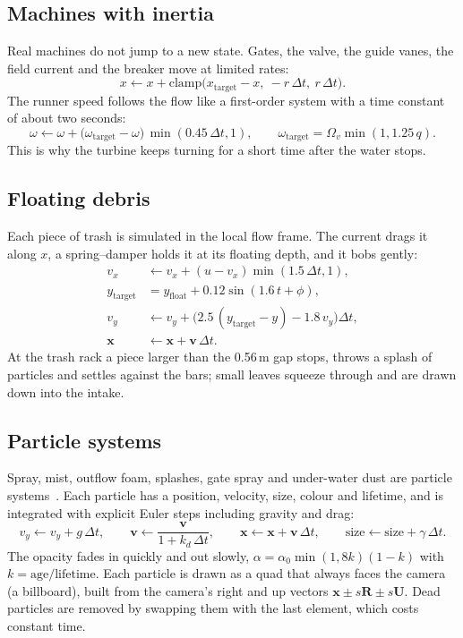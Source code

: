 \documentclass[11pt,a4paper]{report}
\newcommand{\vect}[1]{\mathbf{#1}}
\begin{document}
\subsection{Machines with inertia}

Real machines do not jump to a new state. Gates, the valve, the guide vanes, the field
current and the breaker move at limited rates:
\begin{equation}
x \leftarrow x + \text{clamp}\big(x_{\text{target}} - x,\ -r\,\Delta t,\ r\,\Delta t\big).
\end{equation}
The runner speed follows the flow like a first-order system with a time constant of
about two seconds:
\begin{equation}
\omega \leftarrow \omega + \big(\omega_{\text{target}} - \omega\big)\,\min(0.45\,\Delta t, 1),
\qquad \omega_{\text{target}} = \Omega_v \min(1, 1.25\,q).
\end{equation}
This is why the turbine keeps turning for a short time after the water stops.

\subsection{Floating debris}

Each piece of trash is simulated in the local flow frame. The current drags it along
$x$, a spring--damper holds it at its floating depth, and it bobs gently:
\begin{align}
v_x &\leftarrow v_x + (u - v_x)\min(1.5\,\Delta t, 1), \\
y_{\text{target}} &= y_{\text{float}} + 0.12\sin(1.6\,t + \phi), \\
v_y &\leftarrow v_y + \big(2.5\,(y_{\text{target}} - y) - 1.8\,v_y\big)\Delta t, \\
\vect{x} &\leftarrow \vect{x} + \vect{v}\,\Delta t .
\end{align}
At the trash rack a piece larger than the 0.56\,m gap stops, throws a splash of
particles and settles against the bars; small leaves squeeze through and are drawn
down into the intake.

\subsection{Particle systems}

Spray, mist, outflow foam, splashes, gate spray and under-water dust are particle
systems~\cite{reeves83}. Each particle has a position, velocity, size, colour and
lifetime, and is integrated with explicit Euler steps including gravity and drag:
\begin{equation}
v_y \leftarrow v_y + g\,\Delta t,\qquad
\vect{v} \leftarrow \frac{\vect{v}}{1 + k_d\,\Delta t},\qquad
\vect{x} \leftarrow \vect{x} + \vect{v}\,\Delta t,\qquad
\text{size} \leftarrow \text{size} + \gamma\,\Delta t .
\end{equation}
The opacity fades in quickly and out slowly, $\alpha = \alpha_0\min(1, 8k)(1-k)$ with
$k = \text{age}/\text{lifetime}$. Each particle is drawn as a quad that always faces
the camera (a billboard), built from the camera's right and up vectors
$\vect{x}\pm s\vect{R}\pm s\vect{U}$. Dead particles are removed by swapping them with
the last element, which costs constant time.
\end{document}
